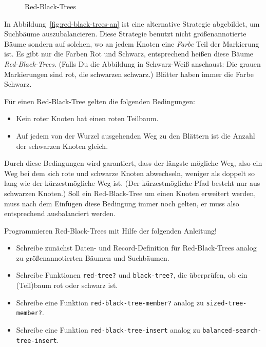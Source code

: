 \begin{aufgabe}
\begin{figure}[tb]
\begin{tikzpicture}[level/.style={sibling distance=13mm},
        triangle/.style = {regular polygon, regular polygon sides=3, draw},
        every node/.style={scale=0.8}]
\end{tikzpicture}    
    \caption{Red-Black-Trees}
    \label{fig:red-black-trees}
  \end{figure}

  In Abbildung~\ref{fig:red-black-trees-an} ist eine alternative
  Strategie abgebildet, um Suchbäume auszubalancieren. Diese Strategie
  benutzt nicht größenannotierte Bäume sondern auf solchen, wo an
  jedem Knoten eine \textit{Farbe} Teil der Markierung ist.  Es gibt
  nur die Farben Rot und Schwarz, entsprechend heißen diese Bäume
  \textit{Red-Black-Trees}.  (Falls Du die
  Abbildung in Schwarz-Weiß anschaust: Die grauen Markierungen sind
  rot, die schwarzen schwarz.)  Blätter haben immer die Farbe Schwarz.

  Für einen Red-Black-Tree gelten die folgenden Bedingungen:
  \begin{itemize}
  \item Kein roter Knoten hat einen roten Teilbaum.
  \item Auf jedem von der Wurzel ausgehenden Weg zu den Blättern ist
    die Anzahl der schwarzen Knoten gleich.
  \end{itemize}
  Durch diese Bedingungen wird garantiert, dass der längste mögliche
  Weg, also ein Weg bei dem sich rote und schwarze Knoten abwechseln,
  weniger als doppelt so lang wie der kürzestmögliche Weg ist. (Der
  kürzestmögliche Pfad besteht nur aus schwarzen Knoten.)  Soll ein
  Red-Black-Tree um einen Knoten erweitert werden, muss nach dem
  Einfügen diese Bedingung immer noch gelten, er muss also
  entsprechend ausbalanciert werden.
  
  Programmieren Red-Black-Trees mit Hilfe der folgenden Anleitung!

  \begin{itemize}
  \item Schreibe zunächst Daten- und Record-Definition für
    Red-Black-Trees analog zu größenannotierten Bäumen und Suchbäumen.
  \item Schreibe Funktionen \lstinline{red-tree?}  und
    \texttt{black-tree?}, die überprüfen, ob ein (Teil)baum rot oder
    schwarz ist.
  \item Schreibe eine Funktion \lstinline{red-black-tree-member?}
    analog zu \lstinline{sized-tree-member?}.
    
  \item Schreibe eine Funktion \lstinline{red-black-tree-insert}
    analog zu \lstinline{balanced-search-tree-insert}.
  \end{itemize}

\end{aufgabe}

